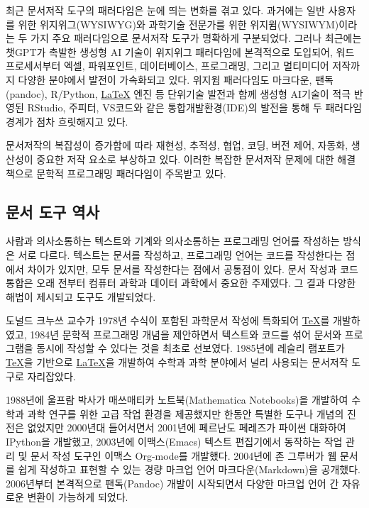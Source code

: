 \documentclass[
  letterpaper,
]{book}
\begin{document}
최근 문서저작 도구의 패러다임은 눈에 띄는 변화를 겪고 있다. 과거에는
일반 사용자를 위한 위지위그(WYSIWYG)와 과학기술 전문가를 위한
위지윔(WYSIWYM)이라는 두 가지 주요 패러다임으로 문서저작 도구가 명확하게
구분되었다. 그러나 최근에는 챗GPT가 촉발한 생성형 AI 기술이 위지위그
패러다임에 본격적으로 도입되어, 워드프로세서부터 엑셀, 파워포인트,
데이터베이스, 프로그래밍, 그리고 멀티미디어 저작까지 다양한 분야에서
발전이 가속화되고 있다. 위지윔 패러다임도 마크다운, 팬독(pandoc),
R/Python, \href{http://example.org}{\LaTeX} 엔진 등 단위기술 발전과 함께
생성형 AI기술이 적극 반영된 RStudio, 주피터, VS코드와 같은
통합개발환경(IDE)의 발전을 통해 두 패러다임 경계가 점차 흐릿해지고 있다.

문서저작의 복잡성이 증가함에 따라 재현성, 추적성, 협업, 코딩, 버전 제어,
자동화, 생산성이 중요한 저작 요소로 부상하고 있다. 이러한 복잡한
문서저작 문제에 대한 해결책으로 문학적 프로그래밍 패러다임이 주목받고
있다.

\hypertarget{uxbb38uxc11c-uxb3c4uxad6c-uxc5eduxc0ac}{%
\subsection{문서 도구
역사}\label{uxbb38uxc11c-uxb3c4uxad6c-uxc5eduxc0ac}}

사람과 의사소통하는 텍스트와 기계와 의사소통하는 프로그래밍 언어를
작성하는 방식은 서로 다르다. 텍스트는 문서를 작성하고, 프로그래밍 언어는
코드를 작성한다는 점에서 차이가 있지만, 모두 문서를 작성한다는 점에서
공통점이 있다. 문서 작성과 코드 통합은 오래 전부터 컴퓨터 과학과 데이터
과학에서 중요한 주제였다. 그 결과 다양한 해법이 제시되고 도구도
개발되었다.

도널드 크누쓰 교수가 1978년 수식이 포함된 과학문서 작성에 특화되어
\href{http://example.org}{\TeX}를 개발하였고, 1984년 문학적 프로그래밍
개념을 제안하면서 텍스트와 코드를 섞어 문서와 프로그램을 동시에 작성할
수 있다는 것을 최초로 선보였다. 1985년에 레슬리 램포트가
\href{http://example.org}{\TeX}을 기반으로
\href{http://example.org}{\LaTeX}을 개발하여 수학과 과학 분야에서 널리
사용되는 문서저작 도구로 자리잡았다. \autocite{knuth84,spivak1990joy}
\index{\LaTeX} 

1988년에 울프람 박사가 매쓰매티카 노트북(Mathematica Notebooks)을
개발하여 수학과 과학 연구를 위한 고급 작업 환경을 제공했지만 한동안
특별한 도구나 개념의 진전은 없었지만 2000년대 들어서면서 2001년에
페르난도 페레즈가 파이썬 대화하여 IPython을 개발했고, 2003년에
이맥스(Emacs) 텍스트 편집기에서 동작하는 작업 관리 및 문서 작성 도구인
이맥스 Org-mode를 개발했다. 2004년에 존 그루버가 웹 문서를 쉽게 작성하고
표현할 수 있는 경량 마크업 언어 마크다운(Markdown)을 공개했다.
2006년부터 본격적으로 팬독(Pandoc) 개발이 시작되면서 다양한 마크업 언어
간 자유로운 변환이 가능하게 되었다.  
\end{document}
